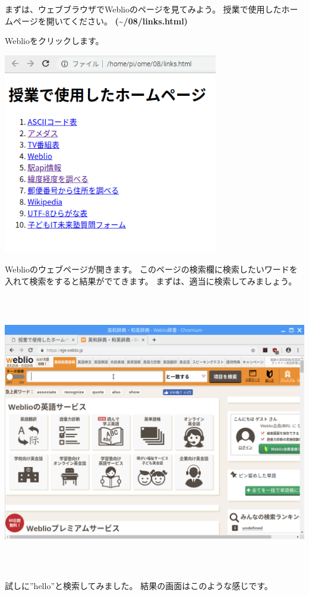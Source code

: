 \documentclass[a4paper,12pt,dvipdfmx]{jarticle}
\begin{document}
まずは、ウェブブラウザでWeblioのページを見てみよう。
授業で使用したホームページを開いてください。
\textbf{(\~{}/08/links.html)}

Weblioをクリックします。 



\begin{center}
\includegraphics[width=9.398cm,height=8.784cm]{textbook-img017.png}

\end{center}


\bigskip


\bigskip

Weblioのウェブページが開きます。
このページの検索欄に検索したいワードを入れて検索をすると結果がでてきます。
まずは、適当に検索してみましょう。



\begin{center}
\includegraphics[width=17.006cm,height=12.157cm]{textbook-img045.png}

\end{center}
\clearpage
試しに”hello”と検索してみました。
結果の画面はこのような感じです。
\end{document}
